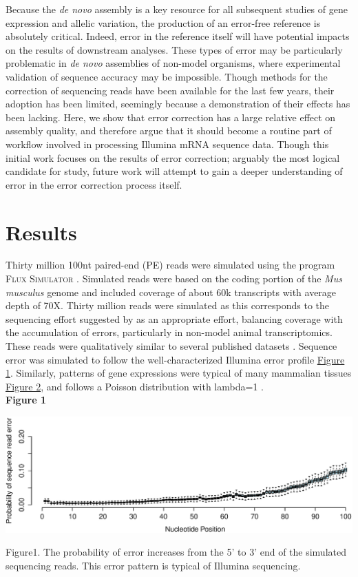 \documentclass[11pt]{article}
\begin{document}
\noindent
Because the \textit{de novo} assembly is a key resource for all subsequent studies of gene expression and allelic variation, the production of an error-free reference is absolutely critical. Indeed, error in the reference itself will have potential impacts on the results of downstream analyses. These types of error may be particularly problematic in \textit{de novo} assemblies of non-model organisms, where experimental validation of sequence accuracy may be impossible. Though methods for the correction of sequencing reads have been available for the last few years, their adoption has been limited, seemingly because a demonstration of their effects has been lacking. Here, we show that error correction has a large relative effect on assembly quality, and therefore argue that it should become a routine part of workflow involved in processing Illumina mRNA sequence data. Though this initial work focuses on the results of error correction; arguably the most logical candidate for study, future work will attempt to gain a deeper understanding of error in the error correction process itself. \\

\section*{Results}
\noindent
Thirty million 100nt paired-end (PE) reads were simulated using the program \textsc{Flux Simulator} \citep{Griebel:2012ti}.  Simulated reads were based on the coding portion of the \textit{Mus musculus} genome and included coverage of about 60k transcripts with average depth of 70X. Thirty million reads were simulated as this corresponds to the sequencing effort suggested by \citep{Francis:2013gc} as an appropriate effort, balancing coverage with the accumulation of errors, particularly in non-model animal transcriptomics.  These reads were qualitatively similar to several published datasets \citep{MacManes:2012bu,Chen:2011ba}. Sequence error was simulated to follow the well-characterized Illumina error profile \hyperlink{Figure 1}{Figure 1}.  Similarly, patterns of gene expressions were typical of many mammalian tissues \hyperlink{Figure 2}{Figure 2}, and follows a Poisson distribution with lambda=1 \citep{Auer:2011bt,Hu:2011cn,Jiang:2009bw}.  \\

\textbf{\hypertarget{Figure 1}{Figure 1}} \\
\centerline{\includegraphics[width=20.0\baselineskip]{newfig1.eps}}
\noindent
\begin{changemargin}{2cm}{2cm} 
Figure1. The probability of error increases from the 5' to 3' end of the simulated sequencing reads. This error pattern is typical of Illumina sequencing.  
\end{changemargin}
\end{document}
